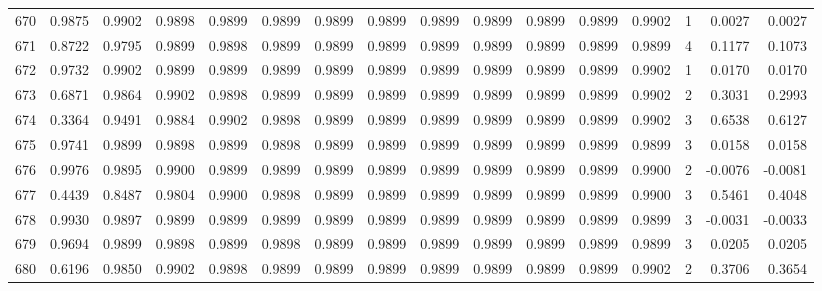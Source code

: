 \begin{tabular}{lrrrrrrrrrrrrrrr}
670 &      0.9875 &  0.9902 &  0.9898 &  0.9899 &  0.9899 &  0.9899 &  0.9899 &  0.9899 &  0.9899 &  0.9899 &   0.9899 &     0.9902 &      1 &                    0.0027 &                     0.0027 \\
671 &      0.8722 &  0.9795 &  0.9899 &  0.9898 &  0.9899 &  0.9899 &  0.9899 &  0.9899 &  0.9899 &  0.9899 &   0.9899 &     0.9899 &      4 &                    0.1177 &                     0.1073 \\
672 &      0.9732 &  0.9902 &  0.9899 &  0.9899 &  0.9899 &  0.9899 &  0.9899 &  0.9899 &  0.9899 &  0.9899 &   0.9899 &     0.9902 &      1 &                    0.0170 &                     0.0170 \\
673 &      0.6871 &  0.9864 &  0.9902 &  0.9898 &  0.9899 &  0.9899 &  0.9899 &  0.9899 &  0.9899 &  0.9899 &   0.9899 &     0.9902 &      2 &                    0.3031 &                     0.2993 \\
674 &      0.3364 &  0.9491 &  0.9884 &  0.9902 &  0.9898 &  0.9899 &  0.9899 &  0.9899 &  0.9899 &  0.9899 &   0.9899 &     0.9902 &      3 &                    0.6538 &                     0.6127 \\
675 &      0.9741 &  0.9899 &  0.9898 &  0.9899 &  0.9898 &  0.9899 &  0.9899 &  0.9899 &  0.9899 &  0.9899 &   0.9899 &     0.9899 &      3 &                    0.0158 &                     0.0158 \\
676 &      0.9976 &  0.9895 &  0.9900 &  0.9899 &  0.9899 &  0.9899 &  0.9899 &  0.9899 &  0.9899 &  0.9899 &   0.9899 &     0.9900 &      2 &                   -0.0076 &                    -0.0081 \\
677 &      0.4439 &  0.8487 &  0.9804 &  0.9900 &  0.9898 &  0.9899 &  0.9899 &  0.9899 &  0.9899 &  0.9899 &   0.9899 &     0.9900 &      3 &                    0.5461 &                     0.4048 \\
678 &      0.9930 &  0.9897 &  0.9899 &  0.9899 &  0.9899 &  0.9899 &  0.9899 &  0.9899 &  0.9899 &  0.9899 &   0.9899 &     0.9899 &      3 &                   -0.0031 &                    -0.0033 \\
679 &      0.9694 &  0.9899 &  0.9898 &  0.9899 &  0.9898 &  0.9899 &  0.9899 &  0.9899 &  0.9899 &  0.9899 &   0.9899 &     0.9899 &      3 &                    0.0205 &                     0.0205 \\
680 &      0.6196 &  0.9850 &  0.9902 &  0.9898 &  0.9899 &  0.9899 &  0.9899 &  0.9899 &  0.9899 &  0.9899 &   0.9899 &     0.9902 &      2 &                    0.3706 &                     0.3654 \\

\end{tabular}
